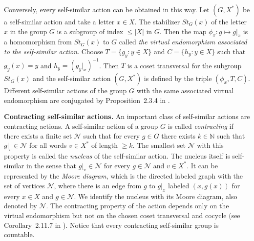 \documentclass[12pt]{article}
\newcommand{\nucl}{\mathcal{N}}
\newcommand{\Dom}{\emph{Dom}\,}
\newtheorem{prop}[theor]{Proposition}
\theoremstyle{definition}
\begin{document}
Conversely, every self-similar action can be obtained in this way. Let $(G,X^{*})$ be a
self-similar action and take a letter $x\in X$. The stabilizer $St_G(x)$ of the letter $x$ in the
group $G$ is a subgroup of index $\leq |X|$ in $G$. Then the map $\phi_x: g\mapsto g|_x$ is a
homomorphism from $St_G(x)$ to $G$ called \emph{the virtual endomorphism associated to the
self-similar action}. Choose $T=\{g_y : y\in X\}$ and $C=\{h_y : y\in X\}$ such that $g_y (x)=y$
and $h_y=\left(g_y|_x\right)^{-1}$. Then $T$ is a coset transversal for the subgroup $St_G(x)$ and
the self-similar action $(G,X^*)$ is defined by the triple $(\phi_x,T,C)$. Different self-similar
actions of the group $G$ with the same associated virtual endomorphism are conjugated by
Proposition~2.3.4 in \cite{self_sim_groups}.




\textbf{Contracting self-similar actions.} An important class of self-similar actions are
contracting actions. A self-similar action of a group $G$ is called \emph{contracting} if there
exists a finite set $\nucl$ such that for every $g\in G$ there exists $k\in\mathbb{N}$ such that
$g|_v\in\nucl$ for all words $v\in X^*$ of length $\geq k$. The smallest set $\nucl$ with this
property is called the \emph{nucleus} of the self-similar action. The nucleus itself is
self-similar in the sense that $g|_v\in\nucl$ for every $g\in\nucl$ and $v\in X^{*}$. It can be
represented by the \textit{Moore diagram}, which is the directed labeled graph with the set of
vertices $\nucl$, where there is an edge from $g$ to $g|_x$ labeled $(x,g(x))$ for every $x\in X$
and $g\in\nucl$. We identify the nucleus with its Moore diagram, also denoted by $\nucl$. The
contracting property of the action depends only on the virtual endomorphism but not on the chosen
coset transversal and cocycle (see Corollary~2.11.7 in \cite{self_sim_groups}). Notice that every
contracting self-similar group is countable.
\end{document}
